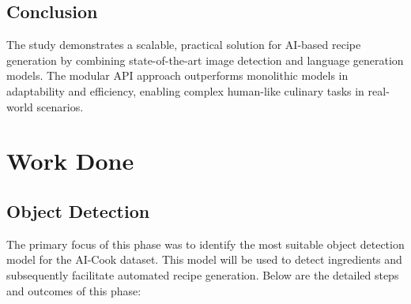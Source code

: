 \documentclass[letterpaper,11pt]{report}
\begin{document}
\section{Conclusion}
The study demonstrates a scalable, practical solution for AI-based recipe generation by combining state-of-the-art image detection and language generation models. The modular API approach outperforms monolithic models in adaptability and efficiency, enabling complex human-like culinary tasks in real-world scenarios.




\chapter{Work Done}\label{chapter:Work Done}

\section{Object Detection}
The primary focus of this phase was to identify the most suitable object detection model for the AI-Cook dataset. This model will be used to detect ingredients and subsequently facilitate automated recipe generation. Below are the detailed steps and outcomes of this phase:
\end{document}
